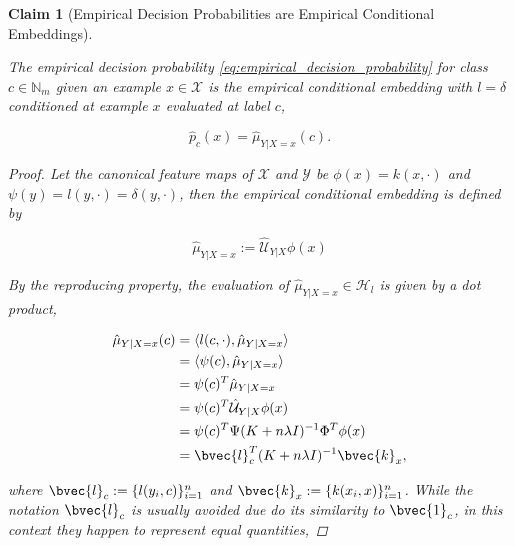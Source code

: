 \documentclass{article}
\newtheorem{claim}{Claim}[section]
\begin{document}
	\begin{claim}[Empirical Decision Probabilities are Empirical Conditional Embeddings]
	\label{thm:empirical_probability_is_embedding}
	
		The empirical decision probability \eqref{eq:empirical_decision_probability} for class $c \in \mathbb{N}_{m}$ given an example $x \in \mathcal{X}$ is the empirical conditional embedding with $l = \delta$ conditioned at example $x$ evaluated at label $c$,
			
		\begin{equation}
			\hat{p}_{c}(x) = \hat{\mu}_{Y | X = x}(c).
		\end{equation}
			
			
		\begin{proof}
			
			Let the canonical feature maps of $\mathcal{X}$ and $\mathcal{Y}$ be $\phi(x) = k(x, \cdot)$ and $\psi(y) = l(y, \cdot) = \delta(y, \cdot)$, then the empirical conditional embedding is defined by
			
			\begin{equation}
				\hat{\mu}_{Y | X = x} := \hat{\mathcal{U}}_{Y | X} \phi(x)
			\end{equation}
			
			By the reproducing property, the evaluation of $\hat{\mu}_{Y | X = x} \in \mathcal{H}_{l}$ is given by a dot product,
	
			\begin{equation}
			\begin{aligned}
				\hat{\mu}_{Y | X = x}(c) &= \langle l(c, \cdot), \hat{\mu}_{Y | X = x} \rangle \\
				&= \langle \psi(c), \hat{\mu}_{Y | X = x} \rangle \\
				&= \psi(c)^{T} \hat{\mu}_{Y | X = x} \\
				&= \psi(c)^{T} \hat{\mathcal{U}}_{Y | X} \phi(x) \\
				&= \psi(c)^{T} \Psi (K + n \lambda I)^{-1} \Phi^{T} \phi(x) \\
				&= \bvec{l}_{c}^{T} (K + n \lambda I)^{-1} \bvec{k}_{x}, \\
			\end{aligned}
			\end{equation}
			
			where $\bvec{l}_{c} := \{l(y_{i}, c)\}_{i = 1}^{n}$ and $\bvec{k}_{x} := \{k(x_{i}, x)\}_{i = 1}^{n}$. While the notation $\bvec{l}_{c}$ is usually avoided due do its similarity to $\bvec{1}_{c}$, in this context they happen to represent equal quantities,
			

\end{proof}
\end{claim}
\end{document}
